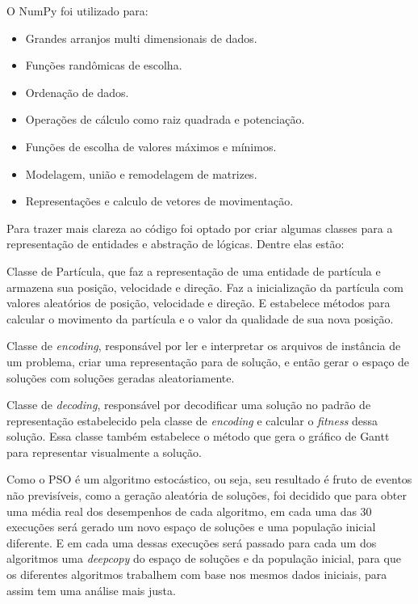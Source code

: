         \hfill\newline
        \noindent O NumPy foi utilizado para: 
        \begin{itemize}
            \item Grandes arranjos multi dimensionais de dados. 
            \item Funções randômicas de escolha.
            \item Ordenação de dados.
            \item Operações de cálculo como raiz quadrada e potenciação.
            \item Funções de escolha de valores máximos e mínimos.
            \item Modelagem, união e remodelagem de matrizes.
            \item Representações e calculo de vetores de movimentação.
        \end{itemize}
        
        \hfill\newline
        Para trazer mais clareza ao código foi optado por criar algumas classes para a representação de entidades e abstração de lógicas. Dentre elas estão:\newline
        
        Classe de Partícula, que faz a representação de uma entidade de partícula e armazena sua posição, velocidade e direção. Faz a inicialização da partícula com valores aleatórios de posição, velocidade e direção. E estabelece métodos para calcular o movimento da partícula e o valor da qualidade de sua nova posição.\newline
        
        Classe de \textit{encoding}, responsável por ler e interpretar os arquivos de instância de um problema, criar uma representação para de solução, e então gerar o espaço de soluções com soluções geradas aleatoriamente.\newline
         
        Classe de \textit{decoding}, responsável por decodificar uma solução no padrão de representação estabelecido pela classe de \textit{encoding} e calcular o \textit{fitness} dessa solução. Essa classe também estabelece o método que gera o gráfico de Gantt para representar visualmente a solução.\newline
        

        Como o PSO é um algoritmo estocástico, ou seja, seu resultado é fruto de eventos não previsíveis, como a geração aleatória de soluções, foi decidido que para obter uma média real dos desempenhos de cada algoritmo, em cada uma das 30 execuções será gerado um novo espaço de soluções e uma população inicial diferente.\newline
        E em cada uma dessas execuções será passado para cada um dos algoritmos uma \textit{deepcopy} do espaço de soluções e da população inicial, para que os diferentes algoritmos trabalhem com base nos mesmos dados iniciais, para assim tem uma análise mais justa.\newline

